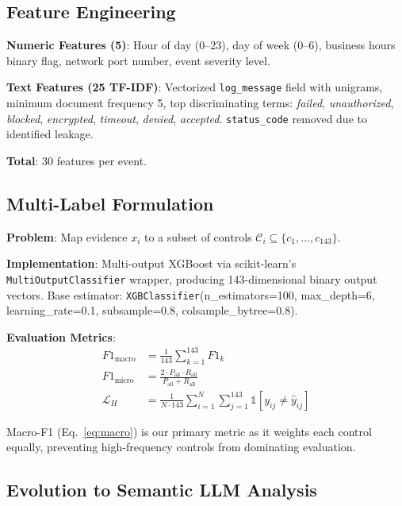 \documentclass[11pt,conference]{IEEEtran}
\begin{document}
\subsection{Feature Engineering}

\textbf{Numeric Features (5)}: Hour of day (0--23), day of week (0--6), business hours binary flag, network port number, event severity level.

\textbf{Text Features (25 TF-IDF)}: Vectorized \texttt{log\_message} field with unigrams, minimum document frequency 5, top discriminating terms: \textit{failed}, \textit{unauthorized}, \textit{blocked}, \textit{encrypted}, \textit{timeout}, \textit{denied}, \textit{accepted}. \texttt{status\_code} removed due to identified leakage.

\textbf{Total}: 30 features per event.

\subsection{Multi-Label Formulation}

\textbf{Problem}: Map evidence $x_i$ to a subset of controls $\mathcal{C}_i \subseteq \{c_1, \ldots, c_{143}\}$.

\textbf{Implementation}: Multi-output XGBoost via scikit-learn's \texttt{MultiOutputClassifier} wrapper, producing 143-dimensional binary output vectors. Base estimator: \texttt{XGBClassifier}(n\_estimators=100, max\_depth=6, learning\_rate=0.1, subsample=0.8, colsample\_bytree=0.8).

\textbf{Evaluation Metrics}:
\begin{align}
F1_{\text{macro}} &= \frac{1}{143}\sum_{k=1}^{143} F1_k \label{eq:macro}\\
F1_{\text{micro}} &= \frac{2 \cdot P_{\text{all}} \cdot R_{\text{all}}}{P_{\text{all}} + R_{\text{all}}} \label{eq:micro}\\
\mathcal{L}_{H} &= \frac{1}{N \cdot 143}\sum_{i=1}^{N}\sum_{j=1}^{143} \mathbb{1}[y_{ij} \neq \hat{y}_{ij}] \label{eq:hamming}
\end{align}

Macro-F1 (Eq.~\ref{eq:macro}) is our primary metric as it weights each control equally, preventing high-frequency controls from dominating evaluation.

\subsection{Evolution to Semantic LLM Analysis}
\end{document}
